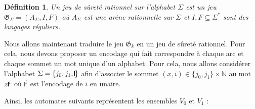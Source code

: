 \documentclass[12pt,a4paper,oneside,titlepage]{report}
\newtheorem{defi}{D\'efinition}[section]
\newcommand{\unary}[1][1.5ex]{\rule{1pt}{#1}}
\begin{document}
\begin{defi}
Un \emph{jeu de sûreté rationnel} sur l'alphabet $\Sigma$ est un jeu $\mathfrak{G}_\Sigma=(A_\Sigma, I, F)$ où $A_\Sigma$ est une arène rationnelle sur $\Sigma$ et $I,F\subseteq \Sigma^*$ sont des langages réguliers.
\end{defi}
\noindent Nous allons maintenant traduire le jeu $\mathfrak{G}_k$ en un jeu de sûreté rationnel. Pour cela, nous devons proposer un encodage qui fait correspondre à chaque arc et chaque sommet un mot unique d'un alphabet. Pour cela, nous allons considérer l'alphabet $\Sigma=\{j_0,j_1,\unary\}$ afin d'associer le sommet $(x,i) \in \{j_0,j_1\}\times\mathbb{N}$ au mot $x\unary^i$ où $\unary^i$ est l'encodage de $i$ en unaire. 

\noindent Ainsi, les automates suivants représentent les ensembles $V_0$ et $V_1$ :
\end{document}
